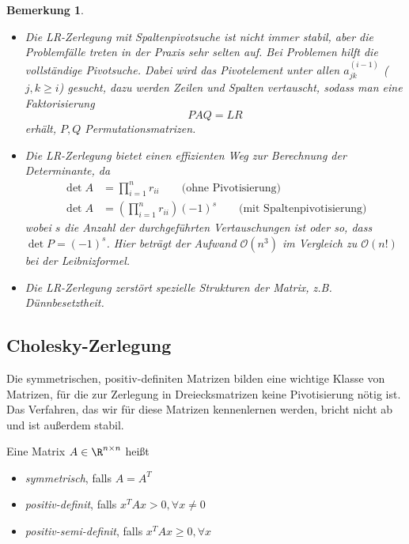 \documentclass[a4paper]{scrartcl}
\numberwithin{equation}{section}
\newtheorem{notee}[thm]{Bemerkung}
\begin{document}
\begin{notee}
	\label{note:3.11}
	\begin{itemize}
		\item
			Die LR-Zerlegung mit Spaltenpivotsuche ist nicht immer stabil, aber die Problemfälle treten in der Praxis sehr selten auf.
			Bei Problemen hilft die vollständige Pivotsuche.
			Dabei wird das Pivotelement unter allen $a_{jk}^{(i-1)}$ ($j,k\ge i$) gesucht, dazu werden Zeilen und Spalten vertauscht, sodass man eine Faktorisierung
			\[
				PAQ = LR
			\]
			erhält, $P,Q$ Permutationsmatrizen.
		\item
			Die LR-Zerlegung bietet einen effizienten Weg zur Berechnung der Determinante, da
			\begin{align*}
				\det A &= \prod_{i=1}^n r_{ii} \qquad \text{(ohne Pivotisierung)}\\
				\det A &= \left(\prod_{i=1}^n r_{ii}\right) (-1)^s \qquad \text{(mit Spaltenpivotisierung)}
			\end{align*}
			wobei $s$ die Anzahl der durchgeführten Vertauschungen ist oder so, dass $\det P = (-1)^s$.
			Hier beträgt der Aufwand $\mathcal O(n^3)$ im Vergleich zu $\mathcal O(n!)$ bei der Leibnizformel.
		\item
			Die LR-Zerlegung zerstört spezielle Strukturen der Matrix, z.B. Dünnbesetztheit.
	\end{itemize}
\end{notee}

\subsection{Cholesky-Zerlegung}

Die symmetrischen, positiv-definiten Matrizen bilden eine wichtige Klasse von Matrizen, für die zur Zerlegung in Dreiecksmatrizen keine Pivotisierung nötig ist.
Das Verfahren, das wir für diese Matrizen kennenlernen werden, bricht nicht ab und ist außerdem stabil.

\begin{df}
	\label{df:3.12}
	Eine Matrix $A\in \R^{n\times n}$ heißt
	\begin{itemize}
		\item \emph{symmetrisch}, falls $A = A^T$
		\item \emph{positiv-definit}, falls $x^TAx > 0, \forall x\neq 0$
		\item \emph{positiv-semi-definit}, falls $x^TAx \ge 0, \forall x$
	\end{itemize}	
\end{df}
\end{document}
